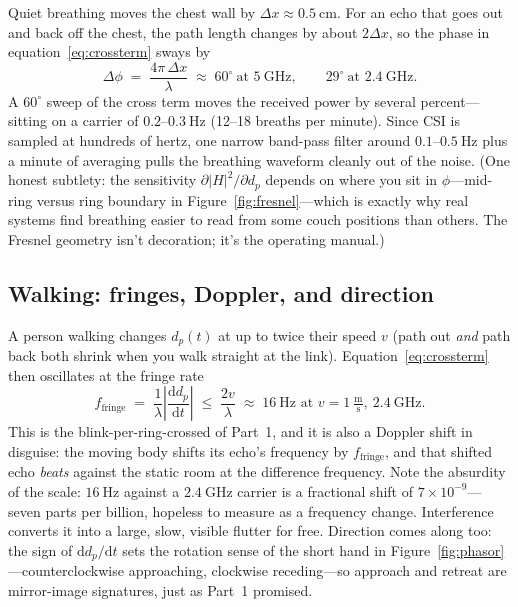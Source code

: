 \documentclass[11pt, letterpaper]{article}
\begin{document}
Quiet breathing moves the chest wall by $\Delta x \approx 0.5\ \text{cm}$. For an echo that goes out and back off the chest, the path length changes by about $2\Delta x$, so the phase in equation~\eqref{eq:crossterm} sways by
\begin{equation}
  \Delta\phi \;=\; \frac{4\pi\, \Delta x}{\lambda}
  \;\approx\; 60^\circ \ \text{at } 5\ \text{GHz}, \qquad 29^\circ \ \text{at } 2.4\ \text{GHz}.
\end{equation}
A $60^\circ$ sweep of the cross term moves the received power by several percent---sitting on a carrier of $0.2$--$0.3\ \text{Hz}$ (12--18 breaths per minute). Since CSI is sampled at hundreds of hertz, one narrow band-pass filter around $0.1$--$0.5\ \text{Hz}$ plus a minute of averaging pulls the breathing waveform cleanly out of the noise. (One honest subtlety: the sensitivity $\partial |H|^2 / \partial d_p$ depends on where you sit in $\phi$---mid-ring versus ring boundary in Figure~\ref{fig:fresnel}---which is exactly why real systems find breathing easier to read from some couch positions than others. The Fresnel geometry isn't decoration; it's the operating manual.)

\subsection{Walking: fringes, Doppler, and direction}

A person walking changes $d_p(t)$ at up to twice their speed $v$ (path out \textit{and} path back both shrink when you walk straight at the link). Equation~\eqref{eq:crossterm} then oscillates at the fringe rate
\begin{equation}
  f_{\text{fringe}} \;=\; \frac{1}{\lambda}\left|\frac{\mathrm{d} d_p}{\mathrm{d}t}\right| \;\le\; \frac{2v}{\lambda}
  \;\approx\; 16\ \text{Hz at } v = 1\ \tfrac{\text{m}}{\text{s}},\ 2.4\ \text{GHz}.
\end{equation}
This is the blink-per-ring-crossed of Part~1, and it is also a Doppler shift in disguise: the moving body shifts its echo's frequency by $f_{\text{fringe}}$, and that shifted echo \textit{beats} against the static room at the difference frequency. Note the absurdity of the scale: $16\ \text{Hz}$ against a $2.4\ \text{GHz}$ carrier is a fractional shift of $7\times 10^{-9}$---seven parts per billion, hopeless to measure as a frequency change. Interference converts it into a large, slow, visible flutter for free. Direction comes along too: the sign of $\mathrm{d}d_p/\mathrm{d}t$ sets the rotation sense of the short hand in Figure~\ref{fig:phasor}---counterclockwise approaching, clockwise receding---so approach and retreat are mirror-image signatures, just as Part~1 promised.
\end{document}
